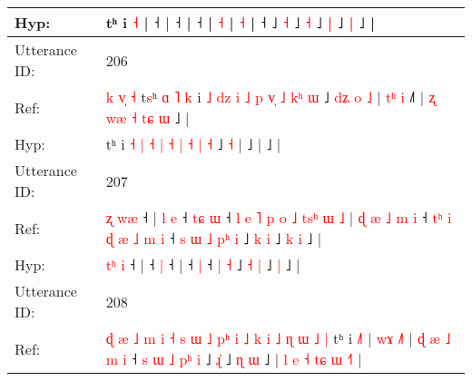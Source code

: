 \documentclass[10pt]{article}
\DeclareRobustCommand{\hl}[1]{{\textcolor{red}{#1}}}
\begin{document}
\begin{longtable}{ll}
 \\
Hyp: & tʰ i \hl{}\hl{˧} |\hl{}\hl{}\hl{}\hl{} ˧\hl{}\hl{}\hl{} \hl{|} ˧ |\hl{}\hl{}\hl{}\hl{} ˧\hl{}\hl{}\hl{}\hl{}\hl{}\hl{}\hl{}\hl{}\hl{}\hl{}\hl{}\hl{}\hl{}\hl{}\hl{}\hl{}\hl{}\hl{}\hl{} |\hl{}\hl{}\hl{}\hl{}\hl{} \hl{˧} |\hl{}\hl{}\hl{}\hl{}\hl{} \hl{}\hl{˧} |\hl{}\hl{}\hl{}\hl{}\hl{} ˧\hl{}\hl{}\hl{}\hl{}\hl{}\hl{}\hl{}\hl{}\hl{}\hl{}\hl{}\hl{} ˩\hl{}\hl{}\hl{} \hl{˧} ˩\hl{}\hl{} \hl{˧} ˩\hl{}\hl{} \hl{|} ˩\hl{}\hl{}\hl{} \hl{|} ˩ |\hl{}\hl{}\hl{}\hl{}\hl{}\hl{}\hl{}
 \\
\midrule
Utterance ID: & 206 \\
Ref: & \hl{k}\hl{ }\hl{v}\hl{̩}\hl{ }\hl{˧}\hl{ }t\hl{s}ʰ\hl{ }\hl{ɑ}\hl{ }\hl{˥}\hl{ }\hl{k} i \hl{˩} \hl{d}\hl{z} \hl{i} \hl{˩} \hl{p} \hl{v}\hl{̩} \hl{˩} \hl{k}\hl{ʰ} \hl{ɯ} ˩\hl{ }\hl{d}\hl{ʑ}\hl{ }\hl{o} \hl{˩} |\hl{ }\hl{t}\hl{ʰ}\hl{ }\hl{i} ˩\hl{˥} |\hl{ }\hl{ʐ}\hl{ }\hl{w}\hl{æ}\hl{ }\hl{˧}\hl{ }\hl{t}\hl{ɕ}\hl{ }\hl{ɯ} ˩ |
 \\
Hyp: & \hl{}\hl{}\hl{}\hl{}\hl{}\hl{}\hl{}t\hl{}ʰ\hl{}\hl{}\hl{}\hl{}\hl{}\hl{} i \hl{˧} \hl{}\hl{|} \hl{˧} \hl{|} \hl{˧} \hl{}\hl{|} \hl{˧} \hl{}\hl{|} \hl{˧} ˩\hl{}\hl{}\hl{}\hl{}\hl{} \hl{˧} |\hl{}\hl{}\hl{}\hl{}\hl{} ˩\hl{} |\hl{}\hl{}\hl{}\hl{}\hl{}\hl{}\hl{}\hl{}\hl{}\hl{}\hl{}\hl{} ˩ |
 \\
\midrule
Utterance ID: & 207 \\
Ref: & \hl{ʐ}\hl{ }\hl{w}\hl{æ} ˧ |\hl{ }\hl{l}\hl{ }\hl{e} ˧\hl{ }\hl{t}\hl{ɕ} \hl{ɯ} ˧\hl{ }\hl{l}\hl{ }\hl{e}\hl{ }\hl{˥}\hl{ }\hl{p}\hl{ }\hl{o}\hl{ }\hl{˩}\hl{ }\hl{t}\hl{s}\hl{ʰ}\hl{ }\hl{ɯ}\hl{ }\hl{˩} |\hl{ }\hl{ɖ}\hl{ }\hl{æ}\hl{ }\hl{˩}\hl{ }\hl{m}\hl{ }\hl{i} ˧\hl{ }\hl{t}\hl{ʰ}\hl{ }\hl{i}\hl{ }\hl{ɖ}\hl{ }\hl{æ}\hl{ }\hl{˩}\hl{ }\hl{m} \hl{i} ˧\hl{ }\hl{s}\hl{ }\hl{ɯ}\hl{ }\hl{˩} \hl{p}\hl{ʰ} \hl{i} ˩ \hl{k} \hl{i} ˩\hl{ }\hl{k} \hl{i} ˩ |
 \\
Hyp: & \hl{t}\hl{ʰ}\hl{ }\hl{i} ˧ |\hl{}\hl{}\hl{}\hl{} ˧\hl{}\hl{}\hl{} \hl{|} ˧\hl{}\hl{}\hl{}\hl{}\hl{}\hl{}\hl{}\hl{}\hl{}\hl{}\hl{}\hl{}\hl{}\hl{}\hl{}\hl{}\hl{}\hl{}\hl{}\hl{} |\hl{}\hl{}\hl{}\hl{}\hl{}\hl{}\hl{}\hl{}\hl{}\hl{} ˧\hl{}\hl{}\hl{}\hl{}\hl{}\hl{}\hl{}\hl{}\hl{}\hl{}\hl{}\hl{}\hl{} \hl{|} ˧\hl{}\hl{}\hl{}\hl{}\hl{}\hl{} \hl{}\hl{|} \hl{˧} ˩ \hl{˧} \hl{|} ˩\hl{}\hl{} \hl{|} ˩ |
 \\
\midrule
Utterance ID: & 208 \\
Ref: & \hl{ɖ}\hl{ }\hl{æ}\hl{ }\hl{˩}\hl{ }\hl{m}\hl{ }\hl{i}\hl{ }\hl{˧}\hl{ }\hl{s}\hl{ }\hl{ɯ}\hl{ }\hl{˩}\hl{ }\hl{p}\hl{ʰ}\hl{ }\hl{i}\hl{ }\hl{˩}\hl{ }\hl{k}\hl{ }\hl{i}\hl{ }\hl{˩}\hl{ }\hl{ɳ}\hl{ }\hl{ɯ}\hl{ }\hl{˩}\hl{ }\hl{|}\hl{ }tʰ i \hl{˩}\hl{˥} |\hl{ }\hl{w}\hl{ɤ} \hl{˩}\hl{˥} |\hl{ }\hl{ɖ}\hl{ }\hl{æ}\hl{ }\hl{˩} \hl{m} \hl{i} ˧\hl{ }\hl{s} \hl{ɯ} \hl{˩} \hl{p}\hl{ʰ} \hl{i} ˩ \hl{ɻ}\hl{̍} ˩\hl{ }\hl{ɳ} \hl{ɯ} ˩ |\hl{ }\hl{l}\hl{ }\hl{e}\hl{ }\hl{˧}\hl{ }\hl{t}\hl{ɕ}\hl{ }\hl{ɯ} \hl{˧}\hl{˥} |

\end{longtable}
\end{document}
